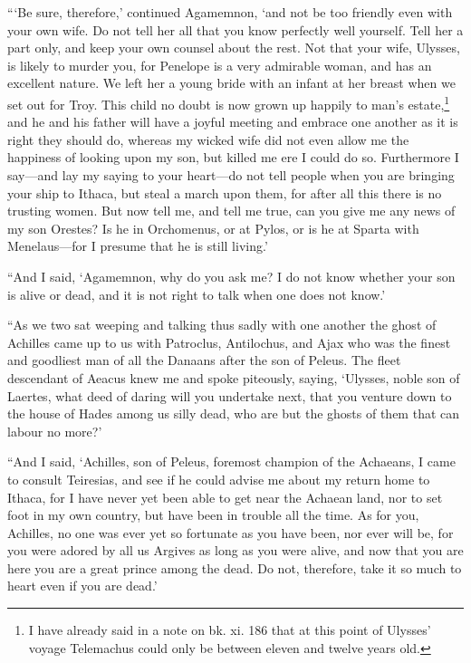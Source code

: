 “‘Be sure, therefore,’ continued Agamemnon, ‘and not be too friendly even with
your own wife. Do not tell her all that you know perfectly well yourself. Tell
her a part only, and keep your own counsel about the rest. Not that your wife,
Ulysses, is likely to murder you, for Penelope is a very admirable woman, and
has an excellent nature. We left her a young bride with an infant at her breast
when we set out for Troy. This child no doubt is now grown up happily to man’s
estate,\footnote{I have already said in a note on bk. xi. 186 that at this point of Ulysses’
voyage Telemachus could only be between eleven and twelve years old.} and he
and his father will have a joyful meeting and embrace one another as it is
right they should do, whereas my wicked wife did not even allow me the
happiness of looking upon my son, but killed me ere I could do so. Furthermore
I say—and lay my saying to your heart—do not tell people when you are bringing
your ship to Ithaca, but steal a march upon them, for after all this there is
no trusting women. But now tell me, and tell me true, can you give me any news
of my son Orestes? Is he in Orchomenus, or at Pylos, or is he at Sparta with
Menelaus—for I presume that he is still living.’

“And I said, ‘Agamemnon, why do you ask me? I do not know whether your son is
alive or dead, and it is not right to talk when one does not know.’

“As we two sat weeping and talking thus sadly with one another the ghost of
Achilles came up to us with Patroclus, Antilochus, and Ajax who was the finest
and goodliest man of all the Danaans after the son of Peleus. The fleet
descendant of Aeacus knew me and spoke piteously, saying, ‘Ulysses, noble son
of Laertes, what deed of daring will you undertake next, that you venture down
to the house of Hades among us silly dead, who are but the ghosts of them that
can labour no more?’

“And I said, ‘Achilles, son of Peleus, foremost champion of the Achaeans, I
came to consult Teiresias, and see if he could advise me about my return home
to Ithaca, for I have never yet been able to get near the Achaean land, nor to
set foot in my own country, but have been in trouble all the time. As for you,
Achilles, no one was ever yet so fortunate as you have been, nor ever will be,
for you were adored by all us Argives as long as you were alive, and now that
you are here you are a great prince among the dead. Do not, therefore, take it
so much to heart even if you are dead.’

